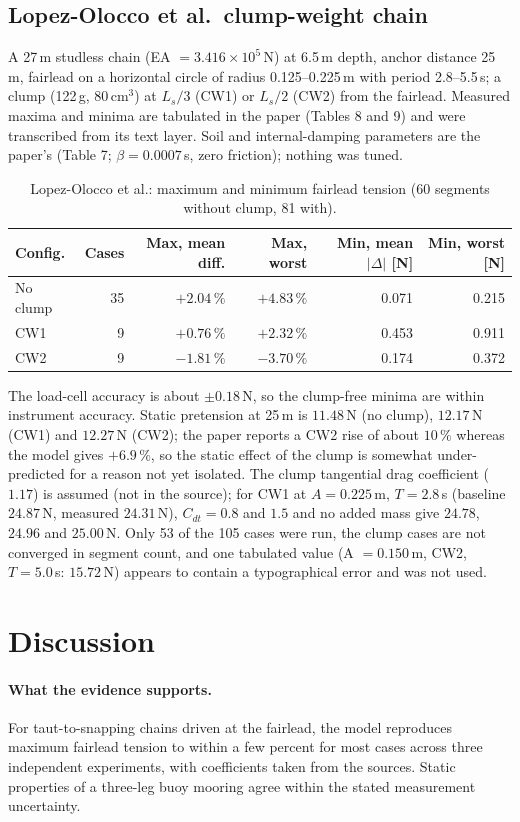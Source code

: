 \documentclass[11pt,a4paper]{article}
\begin{document}
\subsection{Lopez-Olocco et al.\ clump-weight chain \cite{lopezolocco2022}}
A 27\,m studless chain (EA $=3.416\times10^5$\,N) at 6.5\,m depth, anchor distance 25\,m, fairlead on a horizontal circle of radius 0.125--0.225\,m with period 2.8--5.5\,s; a clump (122\,g, 80\,cm$^3$) at $L_s/3$ (CW1) or $L_s/2$ (CW2) from the fairlead. Measured maxima and minima are tabulated in the paper (Tables 8 and 9) and were transcribed from its text layer. Soil and internal-damping parameters are the paper's (Table 7; $\beta=0.0007$\,s, zero friction); nothing was tuned.
\begin{table}[h]
\centering\small
\begin{tabular}{lrrrrr}
\toprule
Config. & Cases & Max, mean diff. & Max, worst & Min, mean $|\Delta|$ [N] & Min, worst [N] \\
\midrule
No clump & 35 & $+2.04\,\%$ & $+4.83\,\%$ & 0.071 & 0.215 \\
CW1 & 9 & $+0.76\,\%$ & $+2.32\,\%$ & 0.453 & 0.911 \\
CW2 & 9 & $-1.81\,\%$ & $-3.70\,\%$ & 0.174 & 0.372 \\
\bottomrule
\end{tabular}
\caption{Lopez-Olocco et al.: maximum and minimum fairlead tension (60 segments without clump, 81 with).}\label{tab:lopez}
\end{table}
The load-cell accuracy is about $\pm0.18$\,N, so the clump-free minima are within instrument accuracy. Static pretension at 25\,m is $11.48$\,N (no clump), $12.17$\,N (CW1) and $12.27$\,N (CW2); the paper reports a CW2 rise of about $10\,\%$ whereas the model gives $+6.9\,\%$, so the static effect of the clump is somewhat under-predicted for a reason not yet isolated. The clump tangential drag coefficient ($1.17$) is assumed (not in the source); for CW1 at $A=0.225$\,m, $T=2.8$\,s (baseline $24.87$\,N, measured $24.31$\,N), $C_{dt}=0.8$ and $1.5$ and no added mass give $24.78$, $24.96$ and $25.00$\,N. Only 53 of the 105 cases were run, the clump cases are not converged in segment count, and one tabulated value (A $=0.150$\,m, CW2, $T=5.0$\,s: $15.72$\,N) appears to contain a typographical error and was not used.

\section{Discussion}
\paragraph{What the evidence supports.} For taut-to-snapping chains driven at the fairlead, the model reproduces maximum fairlead tension to within a few percent for most cases across three independent experiments, with coefficients taken from the sources. Static properties of a three-leg buoy mooring agree within the stated measurement uncertainty.
\end{document}

